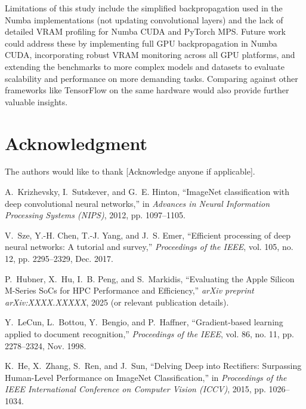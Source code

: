 \documentclass[conference]{IEEEtran} %
\begin{document}
Limitations of this study include the simplified backpropagation used in the Numba implementations (not updating convolutional layers) and the lack of detailed VRAM profiling for Numba CUDA and PyTorch MPS. Future work could address these by implementing full GPU backpropagation in Numba CUDA, incorporating robust VRAM monitoring across all GPU platforms, and extending the benchmarks to more complex models and datasets to evaluate scalability and performance on more demanding tasks. Comparing against other frameworks like TensorFlow on the same hardware would also provide further valuable insights.

\section*{Acknowledgment} %
The authors would like to thank [Acknowledge anyone if applicable].

\begin{thebibliography}{1} %

A.~Krizhevsky, I.~Sutskever, and G.~E. Hinton, ``ImageNet classification with deep convolutional neural networks,'' in \emph{Advances in Neural Information Processing Systems (NIPS)}, 2012, pp. 1097--1105.

V.~Sze, Y.-H. Chen, T.-J. Yang, and J.~S. Emer, ``Efficient processing of deep neural networks: A tutorial and survey,'' \emph{Proceedings of the IEEE}, vol. 105, no. 12, pp. 2295--2329, Dec. 2017.

P.~Hubner, X.~Hu, I.~B. Peng, and S.~Markidis, ``Evaluating the Apple Silicon M-Series SoCs for HPC Performance and Efficiency,'' \emph{arXiv preprint arXiv:XXXX.XXXXX}, 2025 (or relevant publication details).

Y.~LeCun, L.~Bottou, Y.~Bengio, and P.~Haffner, ``Gradient-based learning applied to document recognition,'' \emph{Proceedings of the IEEE}, vol. 86, no. 11, pp. 2278--2324, Nov. 1998.

K.~He, X.~Zhang, S.~Ren, and J.~Sun, ``Delving Deep into Rectifiers: Surpassing Human-Level Performance on ImageNet Classification,'' in \emph{Proceedings of the IEEE International Conference on Computer Vision (ICCV)}, 2015, pp. 1026--1034.


\end{thebibliography}

\end{document}
